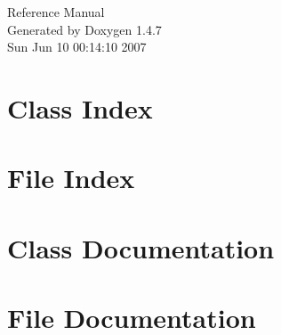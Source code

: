 \documentclass[a4paper]{book}
\begin{document}
\begin{titlepage}
\vspace*{7cm}
\begin{center}
{\Large Reference Manual}\\
\vspace*{1cm}
{\large Generated by Doxygen 1.4.7}\\
\vspace*{0.5cm}
{\small Sun Jun 10 00:14:10 2007}\\
\end{center}
\end{titlepage}
\clearemptydoublepage
{}
\tableofcontents
\clearemptydoublepage
{}
\chapter{Class Index}

\chapter{File Index}

\chapter{Class Documentation}





\chapter{File Documentation}






\printindex
\end{document}
